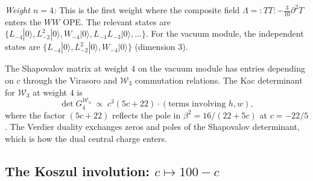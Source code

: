 \documentclass[11pt]{article}
\newcommand{\cW}{\mathcal{W}}
\begin{document}
\medskip
\emph{Weight $n = 4$:}  This is the first weight where the
composite field $\Lambda = {:}TT{:} - \tfrac{3}{10}\partial^2 T$
enters the $WW$ OPE.  The relevant states are
$\{L_{-4}|0\rangle, L_{-2}^2|0\rangle, W_{-4}|0\rangle,
L_{-1}L_{-3}|0\rangle, \ldots\}$.  For the vacuum module,
the independent states are $\{L_{-4}|0\rangle,
L_{-2}^2|0\rangle, W_{-4}|0\rangle\}$ (dimension $3$).

The Shapovalov matrix at weight $4$ on the vacuum module has
entries depending on $c$ through the Virasoro and $\cW_3$
commutation relations.  The Kac determinant
for $\cW_3$ at weight $4$ is
\begin{equation}\label{eq:W3-Kac-det-4}
\det G_4^{\cW_3}
\;\propto\;
c^3(5c + 22) \cdot (\text{terms involving } h, w),
\end{equation}
where the factor $(5c + 22)$ reflects the pole in $\beta^2 = 16/(22+5c)$
at $c = -22/5$.  The Verdier duality exchanges zeros and poles of
the Shapovalov determinant, which is how the dual central charge
enters.

\subsection{The Koszul involution: $c \mapsto 100 - c$}
\end{document}
